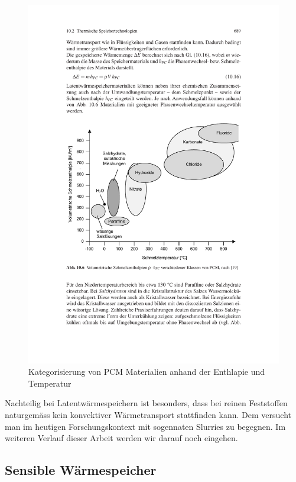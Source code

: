 \documentclass[11pt,a4paper]{scrartcl}
\begin{document}
\begin{figure}[h]
\begin{center}
\includegraphics[scale=1]{images/latentmaterial.pdf}
\caption{Kategorisierung von PCM Materialien anhand der Enthlapie und
Temperatur \cite{Hiebler}}
\label{fig:Materials}
\end{center}
\end{figure}

Nachteilig bei Latentwärmespeichern ist besonders, dass bei reinen Feststoffen
naturgemäss kein konvektiver Wärmetransport stattfinden kann. Dem versucht man
im heutigen Forschungskontext mit sogennaten Slurries zu begegnen. Im weiteren
Verlauf dieser Arbeit werden wir darauf noch eingehen. \cite{Wesselak}

\subsection{Sensible Wärmespeicher}
\end{document}
